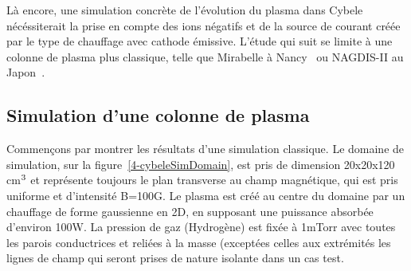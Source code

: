 \begin{refsection}
Là encore, une simulation concrète de l'évolution du plasma dans
Cybele nécéssiterait la prise en compte des ions négatifs et de la source de
courant créée par le type de chauffage avec cathode émissive. L'étude qui suit
se limite à une colonne de plasma plus classique, telle que Mirabelle à
Nancy~\parencite{Mirabelle} ou NAGDIS-II au Japon~\parencite{NAGDIS1}.
 
\subsection{Simulation d'une colonne de plasma}

Commençons par montrer les résultats d'une simulation classique. Le domaine de
simulation, sur la figure~\ref{4-cybeleSimDomain}, est pris de dimension
20x20x120 cm$^{{3}}$ et représente toujours le plan transverse au champ
magnétique, qui est pris uniforme et d'intensité B=100G. Le plasma est créé au
centre du domaine par un chauffage de forme gaussienne en 2D, en supposant une
puissance absorbée d'environ 100W. La pression de gaz (Hydrogène) est fixée à
1mTorr avec toutes les parois conductrices et reliées à la masse (exceptées
celles aux extrémités les lignes de champ qui seront prises de nature isolante
dans un cas test.


\end{refsection}
